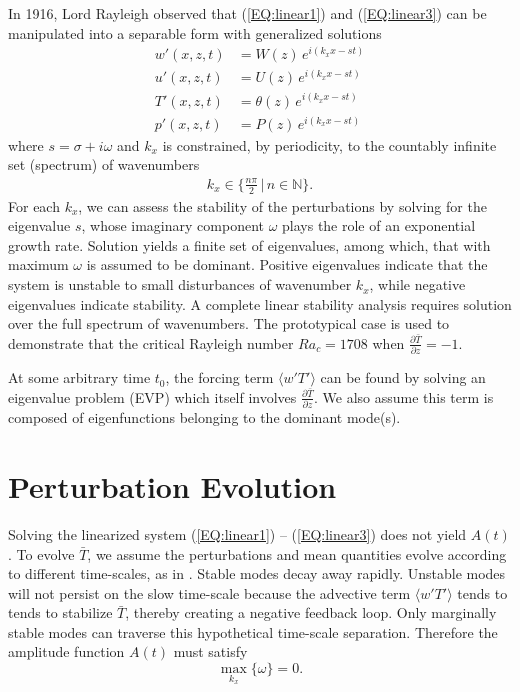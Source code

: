 \documentclass[reprint,amsmath,amssymb,aps]{revtex4-1}
\begin{document}
In 1916, Lord Rayleigh observed that (\ref{EQ:linear1}) and (\ref{EQ:linear3}) can be manipulated into a separable form with generalized solutions
\begin{align}
    w'(x, z, t) &= W(z) \, e^{i(k_xx-st)} \label{EQ:normal_modes1}\\ 
    u'(x, z, t) &= U(z) \, e^{i(k_xx-st)} \label{EQ:normal_modes2}\\ 
    T'(x, z, t) &= \theta(z) \, e^{i(k_xx-st)} \label{EQ:normal_modes3}\\ 
    p'(x, z, t) &= P(z) \, e^{i(k_xx-st)}\label{EQ:normal_modes4}
\end{align}
where $s = \sigma + i\omega$ and $k_x$ is constrained, by periodicity, to the countably infinite set (spectrum) of wavenumbers
\begin{align}
    k_x \in \big\{\frac{n\pi}{2} \, \big| \, n \in \mathbb{N}\big\}.
\end{align}
For each $k_x$, we can assess the stability of the perturbations by solving for the eigenvalue $s$, whose imaginary component $\omega$ plays the role of an exponential growth rate. 
Solution yields a finite set of eigenvalues, among which, that with maximum $\omega$ is assumed to be dominant. 
Positive eigenvalues indicate that the system is unstable to small disturbances of wavenumber $k_x$, while negative eigenvalues indicate stability. 
A complete linear stability analysis requires solution over the full spectrum of wavenumbers. 
The prototypical case is used to demonstrate that the critical Rayleigh number $Ra_c = 1708$ when $\frac{\partial \bar{T}}{\partial z} = -1$.
 
At some arbitrary time $t_0$, the forcing term $\langle w'T' \rangle$ can be found by solving an eigenvalue problem (EVP) which itself involves $\frac{\partial \bar{T}}{\partial z}$. 
We also assume this term is composed of eigenfunctions belonging to the dominant mode(s). 

\section{Perturbation Evolution}
Solving the linearized system (\ref{EQ:linear1}) -- (\ref{EQ:linear3}) does not yield $A(t)$. 
To evolve $\bar{T}$, we assume the perturbations and mean quantities evolve according to different time-scales, as in \cite{michel_chini_2019}.
Stable modes decay away rapidly. 
Unstable modes will not persist on the slow time-scale because the advective term $\langle w'T' \rangle$ tends to tends to stabilize $\bar{T}$, thereby creating a negative feedback loop. Only marginally stable modes can traverse this hypothetical time-scale separation. Therefore the amplitude function $A(t)$ must satisfy
\begin{equation}
    \max_{k_x} \{ \omega \} = 0.
\end{equation}
\end{document}
